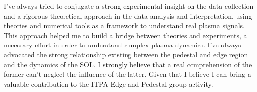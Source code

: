 I've always tried to conjugate a strong experimental
insight on the data collection and a rigorous theoretical approach in
the data analysis and interpretation, using theories and numerical
tools as a framework to understand real plasma signals. This
approach helped me to build a bridge between theories and experiments,
a necessary effort in order to understand complex plasma
dynamics. I've always advocated the strong relationship existing
between the pedestal and edge region and the dynamics of the SOL. I
strongly believe that a real comprehension of the former can't neglect
the influence of the latter. Given that I believe
I can bring a valuable contribution to the ITPA Edge and Pedestal
group activity. 

